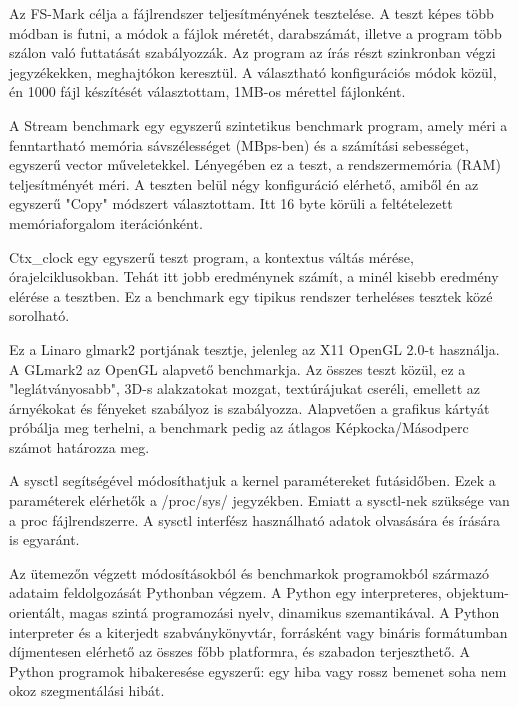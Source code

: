 
Az FS-Mark célja a fájlrendszer teljesítményének tesztelése.
A teszt képes több módban is futni, a módok a fájlok méretét, darabszámát, illetve a program több szálon való futtatását szabályozzák. 
Az program az írás részt szinkronban végzi jegyzékekken, meghajtókon keresztül.
A választható konfigurációs módok közül, én 1000 fájl készítését választottam, 1MB-os mérettel fájlonként.


A Stream benchmark egy egyszerű szintetikus benchmark program, amely méri a fenntartható memória sávszélességet (MBps-ben) és a számítási sebességet, egyszerű vector műveletekkel.
Lényegében ez a teszt, a rendszermemória (RAM) teljesítményét méri.
A teszten belül négy konfiguráció elérhető, amiből én az egyszerű  "Copy" módszert választottam.
Itt 16 byte körüli a feltételezett memóriaforgalom iterációnként.


Ctx\_clock egy egyszerű teszt program, a kontextus váltás mérése, órajelciklusokban.
Tehát itt jobb eredménynek számít, a minél kisebb eredmény elérése a tesztben.
Ez a benchmark egy tipikus rendszer terheléses tesztek közé sorolható.


Ez a Linaro glmark2 portjának tesztje, jelenleg az X11 OpenGL 2.0-t használja. A GLmark2 az OpenGL alapvető benchmarkja. Az összes teszt közül, ez a "leglátványosabb", 3D-s alakzatokat mozgat, textúrájukat cseréli, emellett az árnyékokat és fényeket szabályoz is szabályozza.
Alapvetően a grafikus kártyát próbálja meg terhelni, a benchmark pedig az átlagos Képkocka/Másodperc számot határozza meg.


A sysctl segítségével módosíthatjuk a kernel paramétereket futásidőben. Ezek a paraméterek elérhetők a /proc/sys/ jegyzékben. Emiatt a sysctl-nek szüksége van a proc fájlrendszerre. A sysctl interfész használható adatok olvasására és írására is egyaránt.


Az ütemezőn végzett módosításokból és benchmarkok programokból származó adataim feldolgozását Pythonban végzem.
A Python egy interpreteres, objektum-orientált, magas szintá programozási nyelv, dinamikus szemantikával.
A Python interpreter és a kiterjedt szabványkönyvtár, forrásként vagy bináris formátumban díjmentesen elérhető az összes főbb platformra, és szabadon terjeszthető.
A Python programok hibakeresése egyszerű: egy hiba vagy rossz bemenet soha nem okoz szegmentálási hibát.

